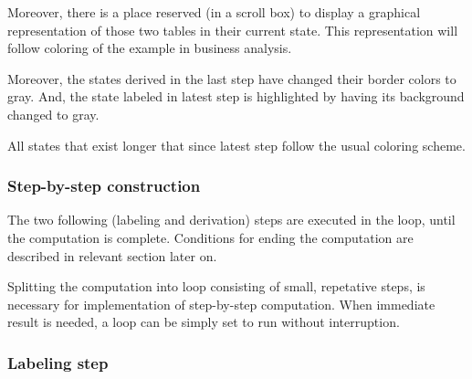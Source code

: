 \documentclass{article}
\begin{document}
Moreover, there is a place reserved (in a scroll box) to display a graphical representation of those
two tables in their current state. This representation will follow coloring of the example in
business analysis.

Moreover, the states derived in the last step have changed their border colors to gray. And, the
state labeled in latest step is highlighted by having its background changed to gray.

All states that exist longer that since latest step follow the usual coloring scheme.

\subsubsection{Step-by-step construction}

The two following (labeling and derivation) steps are executed in the loop, until the computation is
complete. Conditions for ending the computation are described in relevant section later on.

Splitting the computation into loop consisting of small, repetative steps, is necessary for
implementation of step-by-step computation. When immediate result is needed, a loop can be simply
set to run without interruption.

\subsubsection*{Labeling step}
\end{document}

